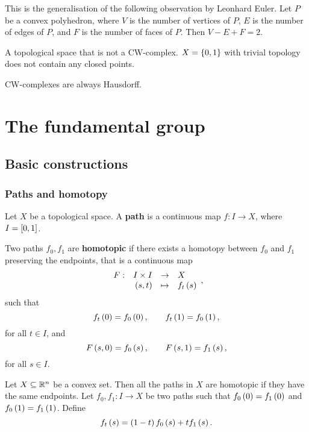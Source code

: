 This is the generalisation of the following observation by Leonhard Euler. Let $ P $ be a convex polyhedron, where $ V $ is the number of vertices of $ P $, $ E $ is the number of edges of $ P $, and $ F $ is the number of faces of $ P $. Then $ V - E + F = 2 $.

\begin{example*}
A topological space that is not a CW-complex. $ X = \cb{0, 1} $ with trivial topology does not contain any closed points.
\end{example*}

\begin{fact*}
CW-complexes are always Hausdorff.
\end{fact*}

\pagebreak

\section{The fundamental group}

\subsection{Basic constructions}

\subsubsection{Paths and homotopy}

Let $ X $ be a topological space. A \textbf{path} is a continuous map $ f : I \to X $, where $ I = \sb{0, 1} $.

\begin{definition*}
Two paths $ f_0, f_1 $ are \textbf{homotopic} if there exists a homotopy between $ f_0 $ and $ f_1 $ preserving the endpoints, that is a continuous map
$$ \function[F]{I \times I}{X}{\rb{s, t}}{f_t\rb{s}}, $$
such that
$$ f_t\rb{0} = f_0\rb{0}, \qquad f_t\rb{1} = f_0\rb{1}, $$
for all $ t \in I $, and
$$ F\rb{s, 0} = f_0\rb{s}, \qquad F\rb{s, 1} = f_1\rb{s}, $$
for all $ s \in I $.
\end{definition*}

\begin{example*}
Let $ X \subseteq \R^n $ be a convex set. Then all the paths in $ X $ are homotopic if they have the same endpoints. Let $ f_0, f_1 : I \to X $ be two paths such that $ f_0\rb{0} = f_1\rb{0} $ and $ f_0\rb{1} = f_1\rb{1} $. Define
$$ f_t\rb{s} = \rb{1 - t}f_0\rb{s} + tf_1\rb{s}. $$
\end{example*}

